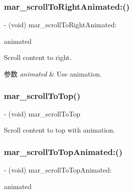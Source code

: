 \subsubsection{\texorpdfstring{mar\+\_\+scroll\+To\+Right\+Animated\+:()}{mar\_scrollToRightAnimated:()}}
{\footnotesize\ttfamily -\/ (void) mar\+\_\+scroll\+To\+Right\+Animated\+: \begin{DoxyParamCaption}\item[{(B\+O\+OL)}]{animated }\end{DoxyParamCaption}}

Scroll content to right.


\begin{DoxyParams}{参数}
{\em animated} & Use animation. \\
\hline
\end{DoxyParams}
\mbox{\label{category_u_i_scroll_view_07_m_a_r_e_x_08_a6133c32f365b283937625027106116c2}} 
\subsubsection{\texorpdfstring{mar\+\_\+scroll\+To\+Top()}{mar\_scrollToTop()}}
{\footnotesize\ttfamily -\/ (void) mar\+\_\+scroll\+To\+Top \begin{DoxyParamCaption}{ }\end{DoxyParamCaption}}

Scroll content to top with animation. \mbox{\label{category_u_i_scroll_view_07_m_a_r_e_x_08_ae1b3801edd92064c707508ee05cbcd36}} 
\subsubsection{\texorpdfstring{mar\+\_\+scroll\+To\+Top\+Animated\+:()}{mar\_scrollToTopAnimated:()}}
{\footnotesize\ttfamily -\/ (void) mar\+\_\+scroll\+To\+Top\+Animated\+: \begin{DoxyParamCaption}\item[{(B\+O\+OL)}]{animated }\end{DoxyParamCaption}}

